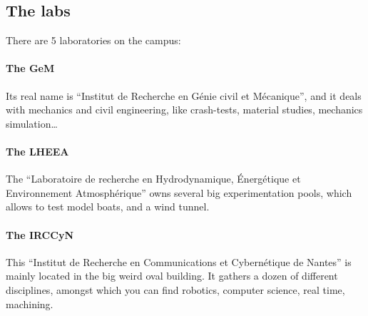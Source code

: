 \subsection{The labs}
There are 5 laboratories on the campus:
\paragraph{The GeM} Its real name is “Institut de Recherche en Génie civil et Mécanique”, and it deals with mechanics and civil engineering, like crash-tests, material studies, mechanics simulation\dots %
\paragraph{The LHEEA} The “Laboratoire de recherche en Hydrodynamique, Énergétique et Environnement Atmosphérique” owns several big experimentation pools, which allows to test model boats, and a wind tunnel. %
\paragraph{The IRCCyN} This “Institut de Recherche en Communications et Cybernétique de Nantes” is mainly located in the big weird oval building. It gathers a dozen of different disciplines, amongst which you can find robotics, computer science, real time, machining. %
